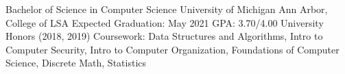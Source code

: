

\begin{cventries}

  \cventry
    {Bachelor of Science in Computer Science} %
    {University of Michigan Ann Arbor, College of LSA} %
    {Expected Graduation: May 2021}
    {GPA: 3.70/4.00} %
    {
        University Honors (2018, 2019) \newline
        Coursework: Data Structures and Algorithms, Intro to Computer Security, Intro to Computer Organization, Foundations of Computer Science, Discrete Math, Statistics
    } 
\end{cventries}
